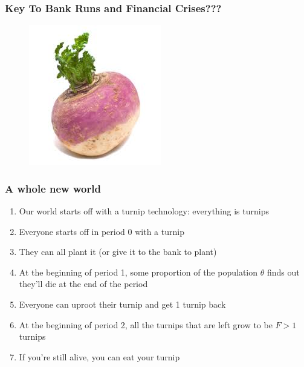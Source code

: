 \documentclass{beamer}
\begin{document}
\begin{frame}
\frametitle{Key To Bank Runs and Financial Crises???}
\begin{figure}
\centering
\includegraphics[scale=0.85]{Figures/turnip.jpg}
\end{figure}
\end{frame}

\begin{frame}
\frametitle{A whole new world}
\begin{enumerate}
\item<1-> Our world starts off with a turnip technology: everything is turnips
\bigskip
\item<2-> Everyone starts off in period 0 with a turnip
\bigskip
\item<3-> They can all plant it (or give it to the bank to plant)
\bigskip
\item<4-> At the beginning of period 1, some proportion of the population $\theta$ finds out they'll die at the end of the period
\bigskip
\item<5-> Everyone can uproot their turnip and get 1 turnip back
\bigskip
\item<6-> At the beginning of period 2, all the turnips that are left grow to be $F>1$ turnips
\bigskip
\item<7-> If you're still alive, you can eat your turnip
\end{enumerate}
\end{frame}
\end{document}
